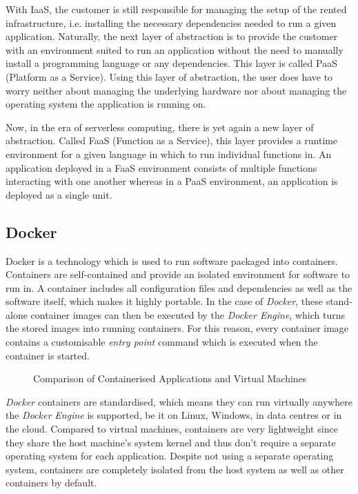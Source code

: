 With IaaS, the customer is still responsible for managing the setup of the rented infrastructure,
i.e. installing the necessary dependencies needed to run a given application. Naturally, the next
layer of abstraction is to provide the customer with an environment suited to run an application
without the need to manually install a programming language or any dependencies. This layer is
called PaaS (Platform as a Service). Using this layer of abstraction, the user does have to worry
neither about managing the underlying hardware nor about managing the operating system the
application is running on.

Now, in the era of serverless computing, there is yet again a new layer of abstraction. Called FaaS
(Function as a Service), this layer provides a runtime environment for a given language in which to
run individual functions in. An application deployed in a FaaS environment consists of multiple
functions interacting with one another whereas in a PaaS environment, an application is deployed as
a single unit.

\subsection{Docker}

Docker is a technology which is used to run software packaged into containers. Containers are
self-contained and provide an isolated environment for software to run in. A container includes all
configuration files and dependencies as well as the software itself, which makes it highly portable.
In the case of \textit{Docker}, these stand-alone container images can then be executed by the
\textit{Docker Engine}, which turns the stored images into running containers. For this reason,
every container image contains a customisable \textit{entry point} command which is executed when
the container is started.

\begin{figure}[H]
  \centering
  \caption{Comparison of Containerised Applications and Virtual Machines \cite{docker-container}}
\end{figure}

\textit{Docker} containers are standardised, which means they can run virtually anywhere the
\textit{Docker Engine} is supported, be it on Linux, Windows, in data centres or in the cloud.
Compared to virtual machines, containers are very lightweight since they share the host machine's
system kernel and thus don't require a separate operating system for each application. Despite not
using a separate operating system, containers are completely isolated from the host system as well
as other containers by default.

